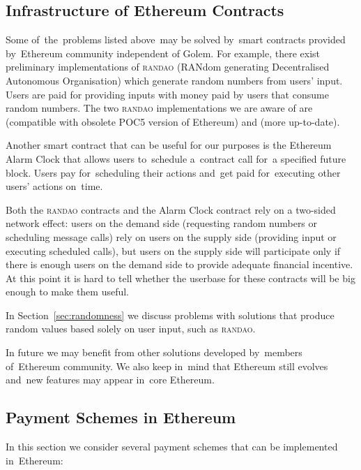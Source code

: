 \documentclass[a4paper]{article}
\newcommand{\randao}{\textsc{randao}}
\begin{document}
    \subsection{Infrastructure of Ethereum Contracts}
    Some of~the~problems listed above~may be solved by~smart contracts provided by~Ethereum community independent of
    Golem. For example, there exist preliminary implementations of \randao{} (RANdom generating Decentralised Autonomous
    Organisation) which generate random numbers from users' input. Users are paid for providing inputs with
    money paid by users that consume random numbers. The two \randao{} implementations we are aware of are \cite{RANDAO}
    (compatible with obsolete POC5 version of Ethereum) and \cite{RANDAO2} (more up-to-date).

    Another smart contract that can be useful for our purposes is the Ethereum Alarm Clock \cite{ALARM}
    that allows users to~schedule a~contract call for~a specified future block.
    Users pay for~scheduling their actions and~get paid for~executing other users' actions on~time.

    Both the \textsc{randao} contracts and the Alarm Clock contract rely on a two-sided network effect:
    users on the demand side (requesting random numbers or scheduling message calls) rely on users on the supply side
    (providing input or executing scheduled calls), but users on the supply side will participate only if there is
    enough users on the demand side to provide adequate financial incentive. At this point it is hard to tell whether 
    the userbase for these contracts will be big enough to make them useful.

    In Section~\ref{sec:randomness} we discuss problems with solutions that produce random values based solely on user input,
    such as \textsc{randao}.
    
    In future we may benefit from other solutions developed by~members of~Ethereum community. We also keep in~mind that
    Ethereum still evolves and~new features may appear in~core Ethereum.

    \subsection{Payment Schemes in Ethereum}
    \label{sec:ethereum-schemes}

    In this section we consider several payment schemes that can be implemented in~Ethereum:
\end{document}
